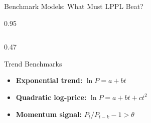 \documentclass[9pt, aspectratio=169, t]{beamer}
\begin{document}
\begin{frame}{Benchmark Models: What Must LPPL Beat?}
    \begin{cminipage}{0.95\textwidth}
    {\scriptsize
    \begin{columns}[T]
        \begin{column}{0.47\textwidth}
            \begin{block}{Trend Benchmarks}
                \begin{itemize}\setlength{\itemsep}{1pt}
                    \item \textbf{Exponential trend:} $\ln P = a + bt$
                    \item \textbf{Quadratic log-price:} $\ln P = a + bt + ct^2$
                    \item \textbf{Momentum signal:} $P_t / P_{t-k} - 1 > \theta$
                \end{itemize}
            \end{block}


\end{column}
\end{columns}}
\end{cminipage}
\end{frame}
\end{document}
